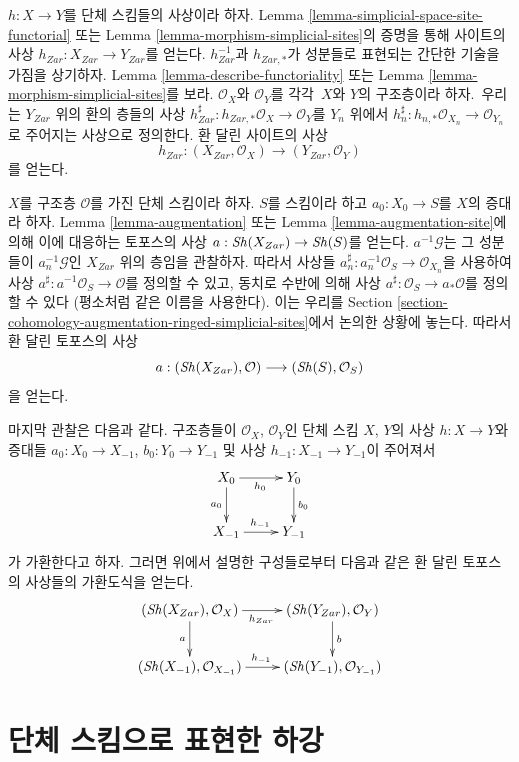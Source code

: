 \medskip\noindent
$h : X \to Y$를 단체 스킴들의 사상이라 하자. Lemma
\ref{lemma-simplicial-space-site-functorial} 또는 Lemma
\ref{lemma-morphism-simplicial-sites}의 증명을 통해 사이트의 사상
$h_{Zar} : X_{Zar} \to Y_{Zar}$를 얻는다.
$h_{Zar}^{-1}$과 $h_{Zar, *}$가 성분들로 표현되는 간단한 기술을
가짐을 상기하자. Lemma \ref{lemma-describe-functoriality} 또는 Lemma
\ref{lemma-morphism-simplicial-sites}를 보라.
$\mathcal{O}_X$와 $\mathcal{O}_Y$를 각각\ $X$와 $Y$의 구조층이라 하자.\ 
우리는 $Y_{Zar}$ 위의 환의 층들의 사상
$h_{Zar}^\sharp : h_{Zar, *}\mathcal{O}_X \to \mathcal{O}_Y$를
$Y_n$ 위에서
$h_n^\sharp : h_{n, *}\mathcal{O}_{X_n} \to \mathcal{O}_{Y_n}$로 주어지는
사상으로 정의한다. 환 달린 사이트의 사상
$$
h_{Zar} : (X_{Zar}, \mathcal{O}_X) \longrightarrow (Y_{Zar}, \mathcal{O}_Y)
$$
를 얻는다.

\medskip\noindent
$X$를 구조층 $\mathcal{O}$를 가진 단체 스킴이라 하자.
$S$를 스킴이라 하고 $a_0 : X_0 \to S$를 $X$의 증대라 하자.
Lemma \ref{lemma-augmentation} 또는 Lemma
\ref{lemma-augmentation-site}에 의해 이에 대응하는 토포스의 사상
$a : \mathop{\mathit{Sh}}\nolimits(X_{Zar}) \to \mathop{\mathit{Sh}}\nolimits(S)$를 얻는다.
$a^{-1}\mathcal{G}$는 그 성분들이 $a_n^{-1}\mathcal{G}$인
$X_{Zar}$ 위의 층임을 관찰하자. 따라서 사상들
$a_n^\sharp : a_n^{-1}\mathcal{O}_S \to \mathcal{O}_{X_n}$을 사용하여
사상 $a^\sharp : a^{-1}\mathcal{O}_S \to \mathcal{O}$를 정의할 수 있고,
동치로 수반에 의해 사상
$a^\sharp : \mathcal{O}_S \to a_*\mathcal{O}$를 정의할 수 있다
(평소처럼 같은 이름을 사용한다). 이는 우리를 Section
\ref{section-cohomology-augmentation-ringed-simplicial-sites}에서 논의한
상황에 놓는다. 따라서 환 달린 토포스의 사상
$$
a : (\mathop{\mathit{Sh}}\nolimits(X_{Zar}), \mathcal{O}) \longrightarrow (\mathop{\mathit{Sh}}\nolimits(S), \mathcal{O}_S)
$$
을 얻는다.

\medskip\noindent
마지막 관찰은 다음과 같다. 구조층들이 $\mathcal{O}_X$,
$\mathcal{O}_Y$인 단체 스킴 $X$, $Y$의 사상 $h : X \to Y$와 증대들
$a_0 : X_0 \to X_{-1}$, $b_0 : Y_0 \to Y_{-1}$ 및 사상
$h_{-1} : X_{-1} \to Y_{-1}$이 주어져서
$$
\xymatrix{
X_0 \ar[r]_{h_0} \ar[d]_{a_0} & Y_0 \ar[d]^{b_0} \\
X_{-1} \ar[r]^{h_{-1}} & Y_{-1}
}
$$
가 가환한다고 하자. 그러면 위에서 설명한 구성들로부터 다음과 같은
환 달린 토포스의 사상들의 가환도식을 얻는다.
$$
\xymatrix{
(\Sh(X_{Zar}), \mathcal{O}_X) \ar[r]_{h_{Zar}} \ar[d]_a &
(\Sh(Y_{Zar}), \mathcal{O}_Y) \ar[d]^b \\
(\Sh(X_{-1}), \mathcal{O}_{X_{-1}}) \ar[r]^{h_{-1}} &
(\Sh(Y_{-1}), \mathcal{O}_{Y_{-1}})
}
$$


\section{단체 스킴으로 표현한 하강}
\label{section-simplicial-descent}

